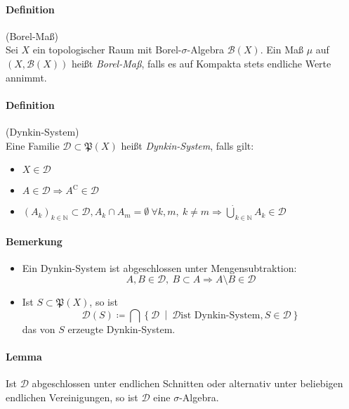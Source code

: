 \documentclass[12pt,a4paper,fleqn]{article}
\def\set#1{{\left\{ #1 \right\}}}
\def\Mid{\ \middle|\ }
\begin{document}
\paragraph{Definition}(Borel-Maß)\\
Sei $X$ ein topologischer Raum mit Borel-$\sigma$-Algebra $\mathcal{B}(X)$. Ein Maß $\mu$ auf $(X, \mathcal{B}(X))$ heißt \textit{Borel-Maß}, falls es auf Kompakta stets endliche Werte annimmt.

\paragraph{Definition}(Dynkin-System)\\
Eine Familie $\mathcal{D} \subset \mathfrak{P}(X)$ heißt \textit{Dynkin-System}, falls gilt:
\begin{itemize}
\item$X \in \mathcal{D}$
\item$A \in \mathcal{D} \Rightarrow A^\mathrm{C} \in \mathcal{D}$
\item$(A_k)_{k \in \mathbb{N}} \subset \mathcal{D}, A_k \cap A_m = \emptyset\ \forall k, m,\ k \not = m \Rightarrow \dot\bigcup_{k \in \mathbb{N}} A_k \in \mathcal{D}$
\end{itemize}

\paragraph{Bemerkung}
\begin{itemize}
\item Ein Dynkin-System ist abgeschlossen unter Mengensubtraktion:
\begin{displaymath}
A, B \in \mathcal{D},\ B \subset A \Rightarrow A \setminus B \in \mathcal{D}
\end{displaymath}
\item Ist $S \subset \mathfrak{P}(X)$, so ist
\begin{displaymath}
\mathcal{D}(S) \coloneqq \bigcap \set{\mathcal{D}\Mid \mathcal{D}  \text{ist Dynkin-System}, S \in \mathcal{D}}
\end{displaymath}
das von $S$ erzeugte Dynkin-System.
\end{itemize}

\paragraph{Lemma} Ist $\mathcal{D}$ abgeschlossen unter endlichen Schnitten oder alternativ unter beliebigen endlichen Vereinigungen, so ist $\mathcal{D}$ eine $\sigma$-Algebra.
\end{document}
